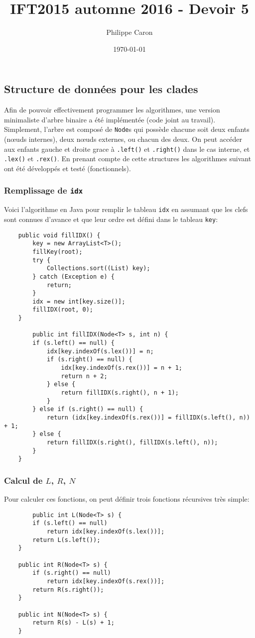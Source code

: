 \documentclass{article}
\title{IFT2015 automne 2016 - Devoir 5} %
\author{Philippe Caron}
\date{\today}
\begin{document}
\maketitle
\subsection{Structure de données pour les clades}
Afin de pouvoir effectivement programmer les algorithmes, une version minimaliste d'arbre binaire a été implémentée (code joint au travail). Simplement, l'arbre est composé de \texttt{Node}s qui possède chacune soit deux enfants (n\oe{}uds internes), deux n\oe{}uds externes, ou chacun des deux. On peut accéder aux enfants gauche et droite grace à \texttt{.left()} et \texttt{.right()} dans le cas interne, et \texttt{.lex()} et \texttt{.rex()}. En prenant compte de cette structures les algorithmes suivant ont été développés et testé (fonctionnels).

\subsubsection{Remplissage de \texttt{idx}}
Voici l'algorithme en Java pour remplir le tableau \texttt{idx} en assumant que les clefs sont connues d'avance et que leur ordre est défini dans le tableau \texttt{key}:
\begin{lstlisting}
	public void fillIDX() {
		key = new ArrayList<T>();
		fillKey(root);
		try {
			Collections.sort((List) key);
		} catch (Exception e) {
			return;
		}
		idx = new int[key.size()];
		fillIDX(root, 0);
	}
  
        public int fillIDX(Node<T> s, int n) {
		if (s.left() == null) {
			idx[key.indexOf(s.lex())] = n;
			if (s.right() == null) {
				idx[key.indexOf(s.rex())] = n + 1;
				return n + 2;
			} else {
				return fillIDX(s.right(), n + 1);
			}
		} else if (s.right() == null) {
			return (idx[key.indexOf(s.rex())] = fillIDX(s.left(), n)) + 1;
		} else {
			return fillIDX(s.right(), fillIDX(s.left(), n));
		}
	}
\end{lstlisting}

\pagebreak

\subsubsection{Calcul de $L$, $R$, $N$}
Pour calculer ces fonctions, on peut définir trois fonctions récursives très simple:
\begin{lstlisting}
        public int L(Node<T> s) {
		if (s.left() == null)
			return idx[key.indexOf(s.lex())];
		return L(s.left());
	}

	public int R(Node<T> s) {
		if (s.right() == null)
			return idx[key.indexOf(s.rex())];
		return R(s.right());
	}

	public int N(Node<T> s) {
		return R(s) - L(s) + 1;
	}
\end{lstlisting}
\end{document}
